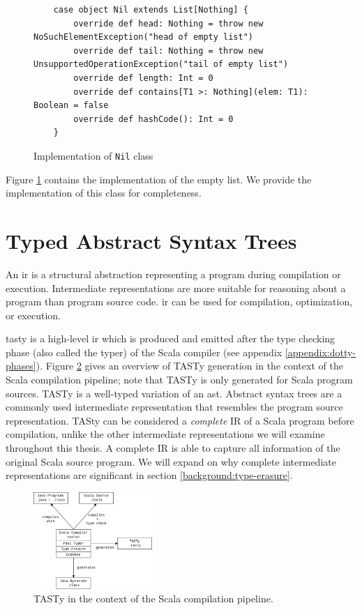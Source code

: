 \begin{figure}[!htb]
	\begin{verbatim}
	case object Nil extends List[Nothing] {
		override def head: Nothing = throw new NoSuchElementException("head of empty list")
		override def tail: Nothing = throw new UnsupportedOperationException("tail of empty list")
		override def length: Int = 0
		override def contains[T1 >: Nothing](elem: T1): Boolean = false
		override def hashCode(): Int = 0
	}
	\end{verbatim}
	\caption{Implementation of \texttt{Nil} class}
	\label{example:nil-impl}
\end{figure}

Figure \ref{example:nil-impl} contains the implementation of the empty list. 
We provide the implementation of this class for completeness.

\section{Typed Abstract Syntax Trees}

An \acrfull{ir} is a structural abstraction representing a program during compilation or execution. 
Intermediate representations are more suitable for reasoning about a program than program source code. 
\acrshort{ir} can be used for compilation\cite{llvm}, optimization\cite{llvm}\cite{ssa}, or execution\cite{java:vm-spec}\cite{clr:spec}.

\acrfull{tasty} is a high-level \acrfull{ir} which is produced and emitted after the type checking phase (also called the typer) of the Scala compiler (see appendix \ref{appendix:dotty-phases}).
Figure \ref{system:tasty} gives an overview of TASTy generation in the context of the Scala compilation pipeline; note that TASTy is only generated for Scala program sources.
TASTy is a well-typed variation of an \acrfull{ast}.
Abstract syntax trees are a commonly used intermediate representation that resembles the program source representation.
TASty can be considered a \textit{complete} IR of a Scala program before compilation, unlike the other intermediate representations we will examine throughout this thesis.
A complete IR is able to capture all information of the original Scala source program.
We will expand on why complete intermediate representations are significant in section \ref{background:type-erasure}.

\begin{figure}[H]
	\centering
	\includegraphics[width=0.4\textwidth]{figures/scala-pipeline.png}
	\caption{TASTy in the context of the Scala compilation pipeline.}
	\label{system:tasty}
\end{figure}

